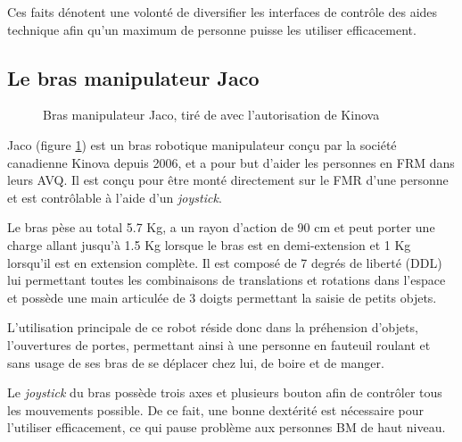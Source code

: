 \documentclass[letterpaper, twoside, 12pt, memoire, creativecommons, hyperref]{thETS}
\begin{document}
Ces faits dénotent une volonté de diversifier les interfaces de contrôle des aides technique afin qu'un maximum de personne puisse les utiliser efficacement.

\subsection{Le bras manipulateur Jaco}

\begin{figure}
	\centering
	\caption{Bras manipulateur Jaco, tiré de \cite{Kinova2012} avec l'autorisation de Kinova}
	\label{fig:jacofull}
\end{figure}

Jaco (figure \ref{fig:jacofull}) est un bras robotique manipulateur conçu par la société canadienne Kinova depuis 2006, et a pour but d'aider les personnes en FRM dans leurs AVQ. Il est conçu pour être monté directement sur le FMR d'une personne et est contrôlable à l'aide d'un \textit{joystick}.

Le bras pèse au total 5.7 Kg, a un rayon d'action de 90 cm et peut porter une charge allant jusqu'à 1.5 Kg lorsque le bras est en demi-extension et 1 Kg lorsqu'il est en extension complète. Il est composé de 7 degrés de liberté (DDL) lui permettant toutes les combinaisons de translations et rotations dans l'espace et possède une main articulée de 3 doigts permettant la saisie de petits objets.

L'utilisation principale de ce robot réside donc dans la préhension d'objets, l'ouvertures de portes, permettant ainsi à une personne en fauteuil roulant et sans usage de ses bras de se déplacer chez lui, de boire et de manger.

Le \textit{joystick} du bras possède trois axes et plusieurs bouton afin de contrôler tous les mouvements possible. De ce fait, une bonne dextérité est nécessaire pour l'utiliser efficacement, ce qui pause problème aux personnes BM de haut niveau.
\end{document}
